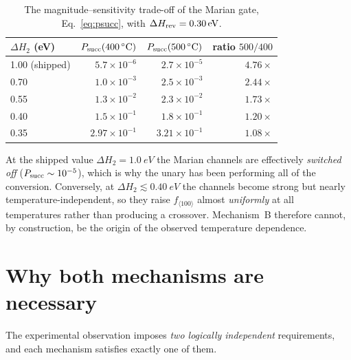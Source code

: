 \documentclass[11pt,a4paper]{article}
\newcommand{\fhkl}{f_{\langle100\rangle}}
\begin{document}
\begin{table}[h]
\centering
\caption{The magnitude--sensitivity trade-off of the Marian gate,
Eq.~\eqref{eq:psucc}, with $\Delta H_{\rm rev}=\SI{0.30}{eV}$.}
\label{tab:psucc}
\begin{tabular}{lrrr}
\toprule
$\Delta H_2$ (eV) & $P_{\rm succ}(\SI{400}{\celsius})$ &
$P_{\rm succ}(\SI{500}{\celsius})$ & ratio $500/400$ \\
\midrule
1.00 (shipped) & $5.7\times10^{-6}$ & $2.7\times10^{-5}$ & $4.76\times$ \\
0.70           & $1.0\times10^{-3}$ & $2.5\times10^{-3}$ & $2.44\times$ \\
0.55           & $1.3\times10^{-2}$ & $2.3\times10^{-2}$ & $1.73\times$ \\
0.40           & $1.5\times10^{-1}$ & $1.8\times10^{-1}$ & $1.20\times$ \\
0.35           & $2.97\times10^{-1}$& $3.21\times10^{-1}$& $1.08\times$ \\
\bottomrule
\end{tabular}
\end{table}

At the shipped value $\Delta H_2=\SI{1.0}{eV}$ the Marian channels are
effectively \emph{switched off} ($P_{\rm succ}\sim10^{-5}$), which is why the
unary has been performing all of the conversion. Conversely, at
$\Delta H_2\lesssim\SI{0.40}{eV}$ the channels become strong but nearly
temperature-independent, so they raise $\fhkl$ almost \emph{uniformly} at all
temperatures rather than producing a crossover. Mechanism~B therefore cannot,
by construction, be the origin of the observed temperature dependence.

\section{Why both mechanisms are necessary}

The experimental observation imposes \emph{two logically independent}
requirements, and each mechanism satisfies exactly one of them.
\end{document}
